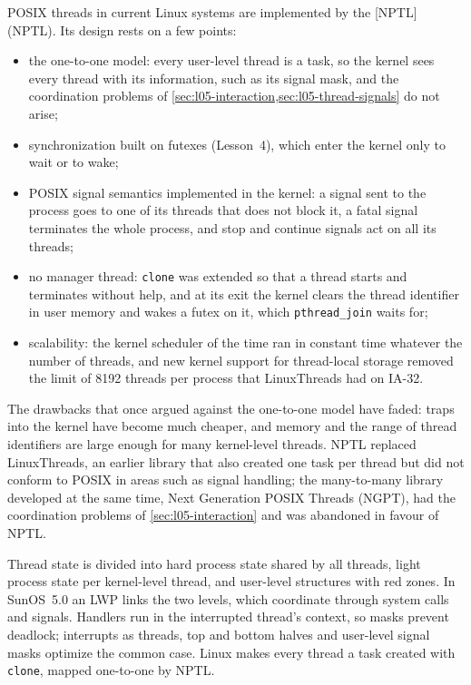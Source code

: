 \documentclass[../main.tex]{subfiles}
\begin{document}
POSIX threads in current Linux systems are implemented by the
[NPTL] (NPTL).  Its design \cite{drepper2005} rests on a few
points:
\begin{itemize}
  \item the one-to-one model: every user-level thread is a task, so the
    kernel sees every thread with its information, such as its signal mask,
    and the coordination problems of
    \cref{sec:l05-interaction,sec:l05-thread-signals} do not arise;
  \item synchronization built on futexes (Lesson~4), which enter the kernel
    only to wait or to wake;
  \item POSIX signal semantics implemented in the kernel: a signal sent to
    the process goes to one of its threads that does not block it, a fatal
    signal terminates the whole process, and stop and continue signals act
    on all its threads;
  \item no manager thread: \texttt{clone} was extended so that a thread
    starts and terminates without help, and at its exit the kernel clears
    the thread identifier in user memory and wakes a futex on it, which
    \texttt{pthread\_join} waits for;
  \item scalability: the kernel scheduler of the time ran in constant time
    whatever the number of threads, and new kernel support for
    thread-local storage removed the limit of 8192 threads per process that
    LinuxThreads had on IA-32.
\end{itemize}
The drawbacks that once argued against the one-to-one model have faded: traps
into the kernel have become much cheaper, and memory and the range of
thread identifiers are large enough for many kernel-level threads.  NPTL
replaced LinuxThreads, an earlier library that also created one task per
thread but did not conform to POSIX in areas such as signal handling; the
many-to-many library developed at the same time, Next Generation POSIX
Threads (NGPT), had the coordination problems of
\cref{sec:l05-interaction} and was abandoned in favour of
NPTL.

\begin{keypoint}
  Thread state is divided into hard process state shared by all threads,
  light process state per kernel-level thread, and user-level structures
  with red zones.  In SunOS~5.0 an LWP links the two levels, which
  coordinate through system calls and signals.  Handlers run in the
  interrupted thread's context, so masks prevent deadlock; interrupts as
  threads, top and bottom halves and user-level signal masks optimize the
  common case.  Linux makes every thread a task created with
  \texttt{clone}, mapped one-to-one by NPTL.
\end{keypoint}
\end{document}
